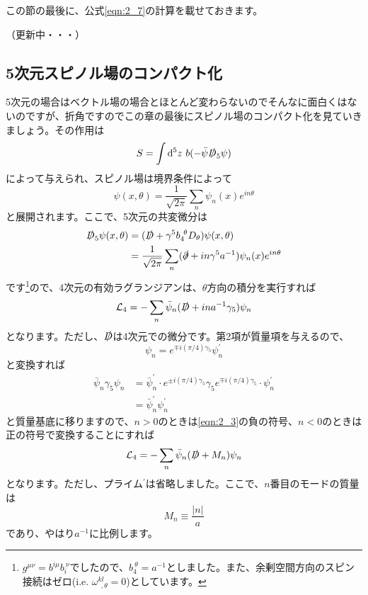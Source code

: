 \documentclass[unicode,a4paper,11pt]{ltjsarticle}
\begin{document}
この節の最後に、公式\eqref{eqn:2_7}の計算を載せておきます。

（更新中・・・）










\subsection{5次元スピノル場のコンパクト化}

5次元の場合はベクトル場の場合とほとんど変わらないのでそんなに面白くはないのですが、折角ですのでこの章の最後にスピノル場のコンパクト化を見ていきましょう。その作用は
\begin{equation}
   S
   =
   \int\dd^5 z\ b(-\bar{\psi}\slashed{D}_{5}\psi)
\end{equation}
によって与えられ、スピノル場は境界条件によって
\begin{equation}
   \psi(x,\theta)
   =
   \frac{1}{\sqrt{2\pi}}
   \sum_{n}\psi_{n}(x)e^{in\theta}
\end{equation}
と展開されます。ここで、5次元の共変微分は
\begin{align}
   \slashed{D}_{5}\psi(x,\theta)
    & =
   (\slashed{D}+\gamma^{5}b_{4}^{\ \theta}D_{\theta})\psi(x,\theta)
   \nonumber
   \\
    & =
   \frac{1}{\sqrt{2\pi}}\sum_{n}
   (\slashed{\partial}+in\gamma^{5}a^{-1})\psi_{n}(x)e^{in\theta}
\end{align}
です\footnote{
$g^{\mu\nu}=b^{i\mu}b_{i}^{\ \nu}$でしたので、$b_{4}^{\ \theta}=a^{-1}$としました。また、余剰空間方向のスピン接続はゼロ(i.e. $\omega^{kl}_{\ \ ,\theta}=0$)としています。
}ので、4次元の有効ラグランジアンは、$\theta$方向の積分を実行すれば
\begin{equation}
   \mathcal{L}_{4}
   =
   -
   \sum_{n}\bar{\psi}_{n}(\slashed{D}+ina^{-1}\gamma_{5})\psi_{n}
\end{equation}
となります。ただし、$\slashed{D}$は4次元での微分です。第2項が質量項を与えるので、
\begin{equation}
   \psi_n
   =
   e^{\mp i(\pi/4)\gamma_{5}}\psi_{n}^{\prime}
   \label{eqn:2_3}
\end{equation}
と変換すれば
\begin{align}
   \bar{\psi}_{n}\gamma_{5}\psi_{n}
    & =
   \bar{\psi}_{n}^{\prime}
   \cdot
   e^{\pm i(\pi/4)\gamma_{5}}\gamma_{5}e^{\mp i(\pi/4)\gamma_{5}}
   \cdot
   \psi_{n}^{\prime}
   \nonumber
   \\
    & =
   \bar{\psi}_{n}^{\prime}
   \psi_{n}^{\prime}
\end{align}
と質量基底に移りますので、$n>0$のときは\eqref{eqn:2_3}の負の符号、$n<0$のときは正の符号で変換することにすれば
\begin{equation}
   \mathcal{L}_{4}
   =
   -
   \sum_{n}\bar{\psi}_{n}(\slashed{D}+M_{n})\psi_{n}
\end{equation}
となります。ただし、プライム$^{\prime}$は省略しました。ここで、$n$番目のモードの質量は
\begin{equation}
   M_{n}
   \equiv
   \frac{|n|}{a}
\end{equation}
であり、やはり$a^{-1}$に比例します。
\end{document}
